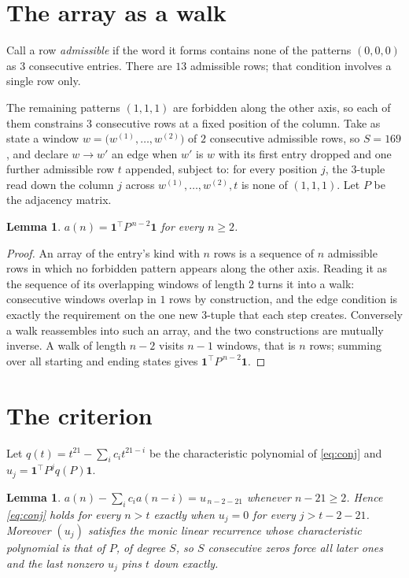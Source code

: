 \documentclass[11pt,a4paper]{article}
\theoremstyle{plain}
\newtheorem{lemma}[theorem]{Lemma}
\theoremstyle{definition}
\begin{document}
\section{The array as a walk}

Call a row \emph{admissible} if the word it forms contains none of the patterns
$(0,0,0)$ as $3$ consecutive entries. There are $13$ admissible rows; that condition
involves a single row only.

The remaining patterns $(1,1,1)$ are forbidden along the other axis, so each of them
constrains $3$ consecutive rows at a fixed position of the column. Take as state a
window $w=\bigl(w^{(1)},\dots,w^{(2)}\bigr)$ of $2$ consecutive admissible
rows, so $S=169$, and declare $w\to w'$ an edge when $w'$ is $w$ with its first entry
dropped and one further admissible row $t$ appended, subject to: for every position
$j$, the $3$-tuple read down the column $j$ across $w^{(1)},\dots,w^{(2)},t$
is none of $(1,1,1)$. Let $P$ be the adjacency matrix.

\begin{lemma}\label{lem:walk}
$a(n)=\mathbf{1}^{\!\top}P^{\,n-2}\mathbf{1}$ for every $n\ge2$.
\end{lemma}

\begin{proof}
An array of the entry's kind with $n$ rows is a sequence of $n$ admissible rows in
which no forbidden pattern appears along the other axis. Reading it as the sequence of its
overlapping windows of length $2$ turns it into a walk: consecutive windows overlap in
$1$ rows by construction, and the edge condition is exactly the requirement on the one
new $3$-tuple that each step creates. Conversely a walk reassembles into such an array,
and the two constructions are mutually inverse. A walk of length $n-2$ visits $n-1$
windows, that is $n$ rows; summing over all starting and ending states gives
$\mathbf{1}^{\!\top}P^{\,n-2}\mathbf{1}$.
\end{proof}

\section{The criterion}

Let $q(t)=t^{21}-\sum_i c_i t^{21-i}$ be the characteristic polynomial of
\eqref{eq:conj} and $u_j=\mathbf{1}^{\!\top}P^{j}q(P)\mathbf{1}$.

\begin{lemma}\label{lem:crit}
$a(n)-\sum_i c_i a(n-i)=u_{\,n-2-21}$ whenever $n-21\ge2$. Hence
\eqref{eq:conj} holds for every $n>t$ exactly when $u_j=0$ for every
$j>t-2-21$. Moreover $(u_j)$ satisfies the monic linear recurrence whose
characteristic polynomial is that of $P$, of degree $S$, so $S$ consecutive zeros force all
later ones and the last nonzero $u_j$ pins $t$ down exactly.
\end{lemma}
\end{document}
